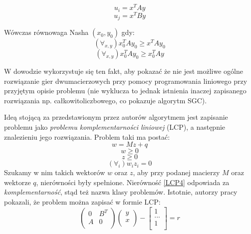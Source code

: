 \documentclass[polish]{standalone}
\begin{document}
\begin{equation}
u_i = x^{T} A y \label{LHa1}
\end{equation}
\begin{equation}
u_j = x^{T} B y \label{LHa2}
\end{equation}

Wówczas równowaga Nasha $(x_0, y_0)$ gdy:
$$(\forall_{x,y}) x_0^T A y_0 \geq x^T A y_0$$
$$(\forall_{x,y}) x_0^T A y_0 \geq x_0^T A y$$

W dowodzie wykorzystuje się ten fakt, aby pokazać że nie jest możliwe ogólne rozwiązanie gier dwumacierzowych przy
pomocy programowania liniowego przy przyjętym opisie problemu (nie wyklucza to jednak istnienia inaczej zapisanego
rozwiązania np. całkowitoliczbowego, co pokazuje algorytm SGC).

Ideą stojącą za przedstawionym przez autorów algorytmem jest zapisanie problemu jako \textit{problemu komplementarności
liniowej} (LCP), a następnie znalezieniu jego rozwiązania. Problem taki ma postać:
\begin{equation}
w = M z + q \label{LCP1}
\end{equation}
\begin{equation}
w \geq 0 \label{LCP2}
\end{equation}
\begin{equation}
z \geq 0 \label{LCP3}
\end{equation}
\begin{equation}
(\forall_i) w_i z_i = 0 \label{LCP4}
\end{equation}
Szukamy w nim takich wektorów $w$ oraz $z$, aby przy podanej macierzy $M$ oraz wektorze $q$, nierówności były spełnione.
Nierówność \ref{LCP4} odpowiada za \textit{komplementarność}, stąd też nazwa klasy problemów. Istotnie, autorzy pracy
pokazali, że problem można zapisać w formie LCP:
\begin{equation}
\begin{pmatrix}
0 & B^T \\
A & 0 \\
\end{pmatrix}
\begin{pmatrix}
y \\
x \\
\end{pmatrix}
-
\begin{bmatrix}
1  \\
...\\
1  \\
\end{bmatrix}
= r
\label{LHb1}
\end{equation}
\end{document}
